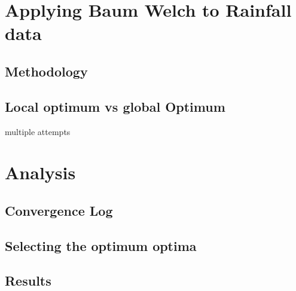 \section{Applying Baum Welch to Rainfall data}

\subsection{Methodology}

\subsection{Local optimum vs global Optimum}
multiple attempts

\section{Analysis}

\subsection{Convergence Log}

\subsection{Selecting the optimum optima}

\subsection{Results}